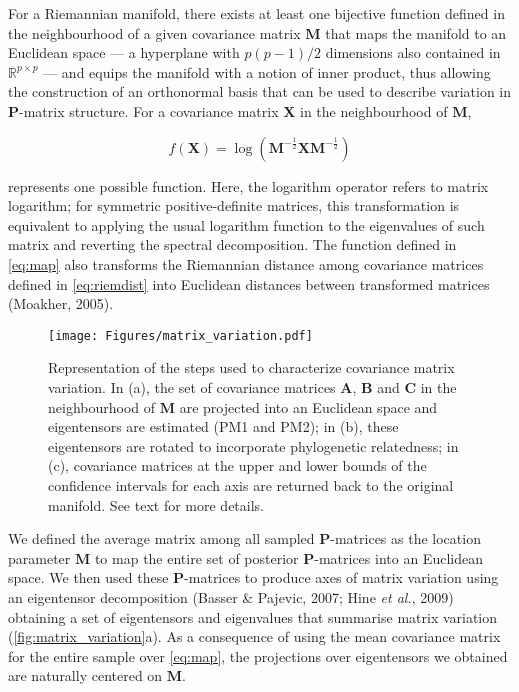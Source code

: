 \documentclass[12pt,twoside]{report}
\begin{document}
For a Riemannian manifold, there exists at least one bijective function
defined in the neighbourhood of a given covariance matrix $\mathbf{M}$
that maps the manifold to an Euclidean space --- a hyperplane with
$p (p - 1) / 2$ dimensions also contained in $\mathbb{R}^{p \times p}$
--- and equips the manifold with a notion of inner product, thus
allowing the construction of an orthonormal basis that can be used to
describe variation in $\mathbf{P}$-matrix structure. For a covariance
matrix $\mathbf{X}$ in the neighbourhood of $\mathbf{M}$,

\begin{equation}
f(\mathbf{X}) = \log (\mathbf{M}^{- \frac{1}{2}} \mathbf{X} \mathbf{M}^{- \frac{1}{2}})
\label{eq:map}
\end{equation}

represents one possible function. Here, the logarithm operator refers to
matrix logarithm; for symmetric positive-definite matrices, this
transformation is equivalent to applying the usual logarithm function to
the eigenvalues of such matrix and reverting the spectral decomposition.
The function defined in \autoref{eq:map} also transforms the Riemannian
distance among covariance matrices defined in \autoref{eq:riemdist} into
Euclidean distances between transformed matrices (Moakher, 2005).

\begin{figure}[htbp]
\centering
\texttt{[image: Figures/matrix\_variation.pdf]}
\caption{Representation of the steps used to characterize covariance
matrix variation. In (a), the set of covariance matrices $\mathbf{A}$,
$\mathbf{B}$ and $\mathbf{C}$ in the neighbourhood of $\mathbf{M}$ are
projected into an Euclidean space and eigentensors are estimated (PM1
and PM2); in (b), these eigentensors are rotated to incorporate
phylogenetic relatedness; in (c), covariance matrices at the upper and
lower bounds of the confidence intervals for each axis are returned back
to the original manifold. See text for more details.
\label{fig:matrix_variation}}
\end{figure}

We defined the average matrix among all sampled $\mathbf{P}$-matrices as
the location parameter $\mathbf{M}$ to map the entire set of posterior
$\mathbf{P}$-matrices into an Euclidean space. We then used these
$\mathbf{P}$-matrices to produce axes of matrix variation using an
eigentensor decomposition (Basser \& Pajevic, 2007; Hine \emph{et al.},
2009) obtaining a set of eigentensors and eigenvalues that summarise
matrix variation (\autoref{fig:matrix_variation}a). As a consequence of
using the mean covariance matrix for the entire sample over
\autoref{eq:map}, the projections over eigentensors we obtained are
naturally centered on $\mathbf{M}$.
\end{document}
